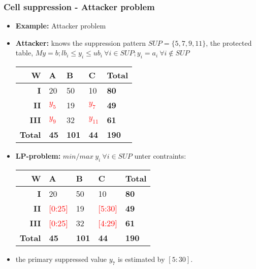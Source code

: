 \begin{frame}\frametitle{Cell suppression - Attacker  problem}
	\begin{itemize}
		\item {\bf Example:} Attacker problem \pause
		\item {\bf Attacker:} knows the suppression pattern $SUP = \{5,7,9,11\}$, the protected table,
		$M y = b; lb_i \leq y_i \leq ub_i ~ \forall i \in SUP; y_i=a_i ~ \forall i \notin SUP$
			\begin{scriptsize}
			\begin{center}
				\begin{tabular}{|r|lll|l|}
				\hline
				{\bf W} & {\bf A} & {\bf B} & {\bf C} & {\bf Total} \\
				\hline
				{\bf I} 	& 20 & 50 & 10 & {\bf 80} \\
				{\bf II} 	& \textcolor{red}{$y_5$} & 19 & \textcolor{red}{$y_7$} & {\bf 49} \\
				{\bf III} & \textcolor{red}{$y_9$} & 32 & \textcolor{red}{$y_{11}$} & {\bf 61} \\
				\hline
				{\bf Total} & {\bf 45} & {\bf 101} & {\bf 44} & {\bf 190} \\
				\hline
				\end{tabular}
			\end{center}
			\end{scriptsize}	\pause

		\item {\bf LP-problem:} $min/max ~ y_i ~ \forall i \in SUP$ unter contraints:\pause
			\begin{scriptsize}
			\begin{center}
				\begin{tabular}{|r|lll|l|}
				\hline
				{\bf W} & {\bf A} & {\bf B} & {\bf C} & {\bf Total} \\
				\hline
				{\bf I} 	& 20 & 50 & 10 & {\bf 80} \\
				{\bf II} 	& \textcolor{red}{[0:25]} & 19 & \textcolor{red}{[5:30]} & {\bf 49} \\
				{\bf III} & \textcolor{red}{[0:25]} & 32 & \textcolor{red}{[4:29]} & {\bf 61} \\
				\hline
				{\bf Total} & {\bf 45} & {\bf 101} & {\bf 44} & {\bf 190} \\
				\hline
				\end{tabular}
			\end{center}
			\end{scriptsize}	\pause
		\item the primary suppressed value $y_7$ is estimated by $[5:30]$.
	\end{itemize}
\end{frame}


